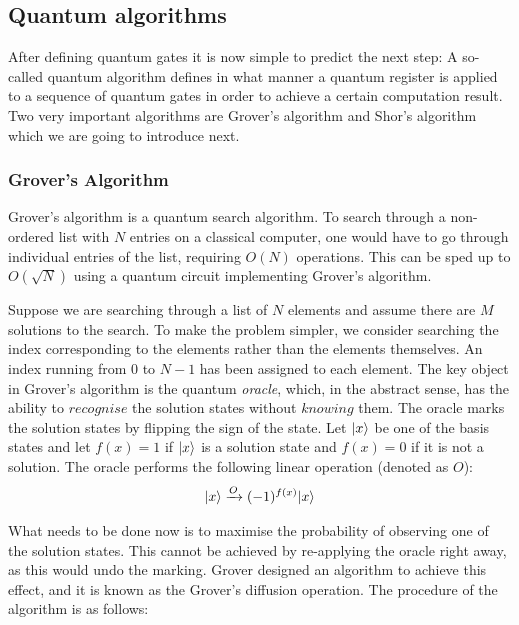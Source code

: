 \documentclass[bibliography=totocnumbered]{article}
\theoremstyle{NoticeStyle}
\begin{document}
\subsection{Quantum algorithms}\label{sec:Quantum algorithms}

After defining quantum gates it is now simple to predict the next step: A so-called quantum algorithm defines in what manner a quantum register is applied to a sequence of quantum gates in order to achieve a certain computation result. Two very important algorithms are Grover's algorithm and Shor's algorithm which we are going to introduce next.



\subsubsection{Grover's Algorithm}
Grover's algorithm is a quantum search algorithm. To search through a non-ordered list with $N$ entries on a classical computer, one would have to go through individual entries of the list, requiring $O(N)$ operations. This can be sped up to $O(\sqrt{N})$ using a quantum circuit implementing Grover's algorithm.

Suppose we are searching through a list of $N$ elements and assume there are $M$ solutions to the search. To make the problem simpler, we consider searching the index corresponding to the elements rather than the elements themselves. An index running from $0$ to $N-1$ has been assigned to each element.
The key object in Grover's algorithm is the quantum \emph{oracle}, which, in the abstract sense, has the ability to $recognise$ the solution states without $knowing$ them. The oracle marks the solution states by flipping the sign of the state. Let ${\left\vert{x}\right\rangle}$ be one of the basis states and let $f(x) = 1$ if ${\left\vert{x}\right\rangle}$ is a solution state and $f(x) = 0$ if it is not a solution. The oracle performs the following linear operation (denoted as $O$):
\begin{align}
	{\left\vert{x}\right\rangle} \xrightarrow{O} (-1)^{f(x)}{\left\vert{x}\right\rangle}
\end{align}

What needs to be done now is to maximise the probability of observing one of the solution states. This cannot be achieved by re-applying the oracle right away, as this would undo the marking. Grover designed an algorithm to achieve this effect, and it is known as the Grover's diffusion operation. The procedure of the algorithm is as follows:
\end{document}

